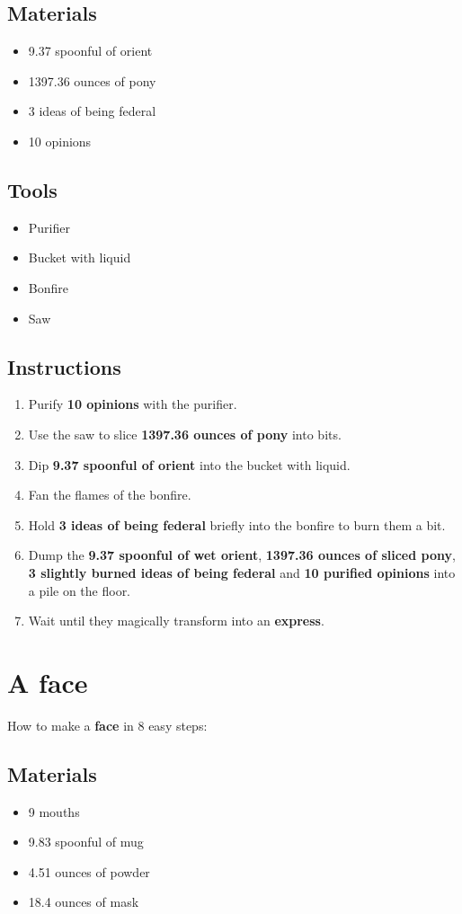 \documentclass{article}
\begin{document}
\subsection{Materials}\begin{itemize}
\item 
9.37 spoonful of orient
\item 
1397.36 ounces of pony
\item 
3 ideas of being federal
\item 
10 opinions
\end{itemize}
\subsection{Tools}\begin{itemize}
\item 
Purifier
\item 
Bucket with liquid
\item 
Bonfire
\item 
Saw
\end{itemize}
\subsection{Instructions}\begin{enumerate}
\item 
Purify \textbf{10 opinions} with the purifier.
\item 
Use the saw to slice \textbf{1397.36 ounces of pony} into bits.
\item 
Dip \textbf{9.37 spoonful of orient} into the bucket with liquid.
\item 
Fan the flames of the bonfire.
\item 
Hold \textbf{3 ideas of being federal} briefly into the bonfire to burn them a bit.
\item 
Dump the \textbf{9.37 spoonful of wet orient}, \textbf{1397.36 ounces of sliced pony}, \textbf{3 slightly burned ideas of being federal} and \textbf{10 purified opinions} into a pile on the floor.
\item 
Wait until they magically transform into an \textbf{express}.
\end{enumerate}
\newpage
\section{A face}How to make a \textbf{face} in 8 easy steps:

\subsection{Materials}\begin{itemize}
\item 
9 mouths
\item 
9.83 spoonful of mug
\item 
4.51 ounces of powder
\item 
18.4 ounces of mask
\end{itemize}
\end{document}
